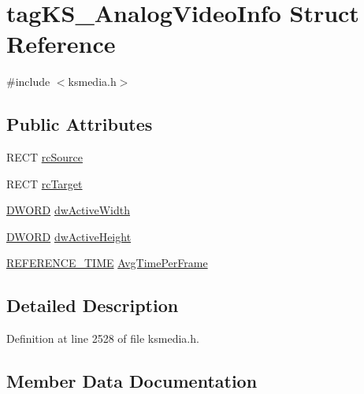 \hypertarget{structtag_k_s___analog_video_info}{}\section{tag\+K\+S\+\_\+\+Analog\+Video\+Info Struct Reference}
\label{structtag_k_s___analog_video_info}


{\ttfamily \#include $<$ksmedia.\+h$>$}

\subsection*{Public Attributes}
\begin{DoxyCompactItemize}
\item 
R\+E\+CT \hyperlink{structtag_k_s___analog_video_info_a8b911b5afe5a34e801d63ef8392188cf}{rc\+Source}
\item 
R\+E\+CT \hyperlink{structtag_k_s___analog_video_info_a50fa6c382f127c5b0337a96ccdfa0e9e}{rc\+Target}
\item 
\hyperlink{mapinls_8h_ad342ac907eb044443153a22f964bf0af}{D\+W\+O\+RD} \hyperlink{structtag_k_s___analog_video_info_add0600d5b3d93c3e13d66c710aa15e6b}{dw\+Active\+Width}
\item 
\hyperlink{mapinls_8h_ad342ac907eb044443153a22f964bf0af}{D\+W\+O\+RD} \hyperlink{structtag_k_s___analog_video_info_a7e3a7d5bebd089fbd6a4090b0b493be4}{dw\+Active\+Height}
\item 
\hyperlink{ksmedia_8h_a83927f70641d4e9a344563bd9ddb15ae}{R\+E\+F\+E\+R\+E\+N\+C\+E\+\_\+\+T\+I\+ME} \hyperlink{structtag_k_s___analog_video_info_ac7e8df9002937184ab7b51dfb2aff3dd}{Avg\+Time\+Per\+Frame}
\end{DoxyCompactItemize}


\subsection{Detailed Description}


Definition at line 2528 of file ksmedia.\+h.



\subsection{Member Data Documentation}
